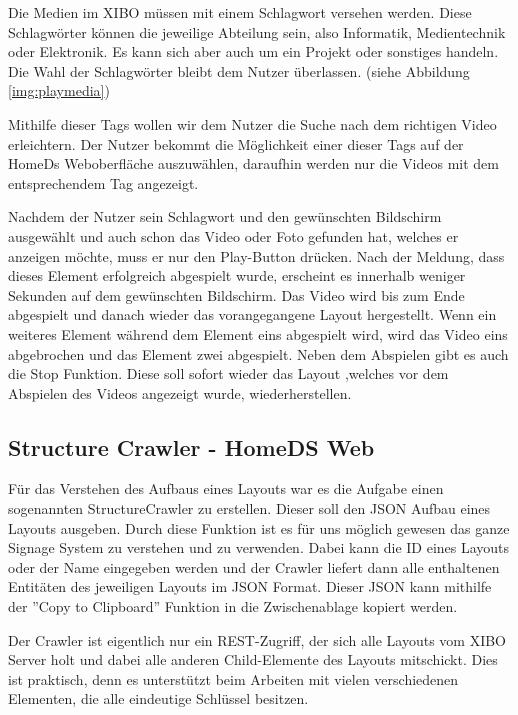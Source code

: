 Die Medien im XIBO müssen mit einem Schlagwort versehen werden. Diese Schlagwörter können die jeweilige Abteilung sein, also Informatik, Medientechnik oder Elektronik. Es kann sich aber auch um ein Projekt oder sonstiges handeln. Die Wahl der Schlagwörter bleibt dem Nutzer überlassen. (siehe Abbildung \ref{img:playmedia})

Mithilfe dieser Tags wollen wir dem Nutzer die Suche nach dem richtigen Video erleichtern. Der Nutzer bekommt die Möglichkeit einer dieser Tags auf der HomeDs Weboberfläche auszuwählen, daraufhin werden nur die Videos mit dem entsprechendem Tag angezeigt.

Nachdem der Nutzer sein Schlagwort und den gewünschten Bildschirm ausgewählt und auch schon das Video oder Foto gefunden hat, welches er anzeigen möchte, muss er nur den Play-Button drücken. Nach der Meldung, dass dieses Element erfolgreich abgespielt wurde, erscheint es innerhalb weniger Sekunden auf dem gewünschten Bildschirm. Das Video wird bis zum Ende abgespielt und danach wieder das vorangegangene Layout hergestellt. Wenn ein weiteres Element während dem Element eins abgespielt wird, wird das Video eins abgebrochen und das Element zwei abgespielt. Neben dem Abspielen gibt es auch die Stop Funktion. Diese soll sofort wieder das Layout ,welches vor dem Abspielen des Videos angezeigt wurde, wiederherstellen.


\subsection{Structure Crawler - HomeDS Web}\label{sec:javaeestructurecrawler}
Für das Verstehen des Aufbaus eines Layouts war es die Aufgabe einen sogenannten StructureCrawler zu erstellen. Dieser soll den JSON Aufbau eines Layouts ausgeben. Durch diese Funktion ist es für uns möglich gewesen das ganze Signage System zu verstehen und zu verwenden. Dabei kann die ID eines Layouts oder der Name eingegeben werden und der Crawler liefert dann alle enthaltenen Entitäten des jeweiligen Layouts im JSON Format. Dieser JSON kann mithilfe der ''Copy to Clipboard'' Funktion in die Zwischenablage kopiert werden.

Der Crawler ist eigentlich nur ein REST-Zugriff, der sich alle Layouts vom XIBO Server holt und dabei alle anderen Child-Elemente des Layouts mitschickt. Dies ist praktisch, denn es unterstützt beim Arbeiten mit vielen verschiedenen Elementen, die alle eindeutige Schlüssel besitzen.

